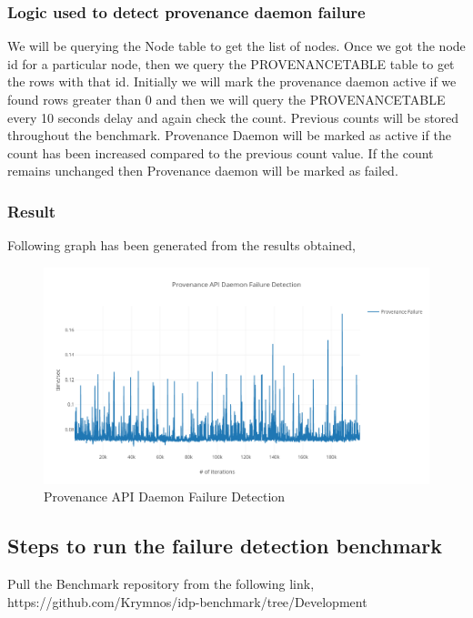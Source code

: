\subsubsection{Logic used to detect provenance daemon failure}

We will be querying the Node table to get the list of nodes. Once we got the node id for a particular node, then we query the PROVENANCETABLE table to get the rows with that id. Initially we will mark the provenance daemon active if we found rows greater than 0 and then we will query the PROVENANCETABLE every 10 seconds delay and again check the count. Previous counts will be stored throughout the benchmark. Provenance Daemon will be marked as active if the count has been increased compared to the previous count value. If the count remains unchanged then Provenance daemon will be marked as failed.

\subsubsection{Result}

Following graph has been generated from the results obtained,

\begin{figure}[H]
	\center
	\includegraphics[width=1\textwidth]{figures/benchmark_provenance.png}
	\caption{Provenance API Daemon Failure Detection}
	\label{fig:benchmark_provenance}
\end{figure}


\subsection{Steps to run the failure detection benchmark}


Pull the Benchmark repository from the following link,
https://github.com/Krymnos/idp-benchmark/tree/Development

